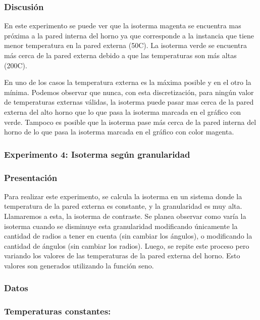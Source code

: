       \subsubsection*{Discusión}
        En este experimento se puede ver que la isoterma magenta se encuentra mas próxima a la pared interna del horno ya que corresponde a la instancia que tiene menor temperatura en la pared externa (50{\degree}C). La isoterma verde se encuentra más cerca de la pared externa debido a que las temperaturas son más altas (200{\degree}C).

        En uno de los casos la temperatura externa es la máxima posible y en el otro la mínima. Podemos observar que nunca, con esta discretización, para ningún valor de temperaturas externas válidas, la isoterma puede pasar mas cerca de la pared externa del alto horno que lo que pasa la isoterma marcada en el gráfico con verde. Tampoco es posible que la isoterma pase más cerca de la pared interna del horno de lo que pasa la isoterma marcada en el gráfico con color magenta.


    \subsubsection*{Experimento 4: Isoterma según granularidad} 
      
      \subsubsection*{Presentación}
        Para realizar este experimento, se calcula la isoterma en un sistema donde la temperatura de la pared externa es constante, y la granularidad es muy alta. Llamaremos a esta, la isoterma de contraste. Se planea observar como varía la isoterma cuando se disminuye esta granularidad modificando únicamente la cantidad de radios a tener en cuenta (sin cambiar los ángulos), o modificando la cantidad de ángulos (sin cambiar los radios).
        Luego, se repite este proceso pero variando los valores de las temperaturas de la pared externa del horno. Esto valores son generados utilizando la función seno.

      \subsubsection*{Datos}

      \subsubsection*{Temperaturas constantes:}

